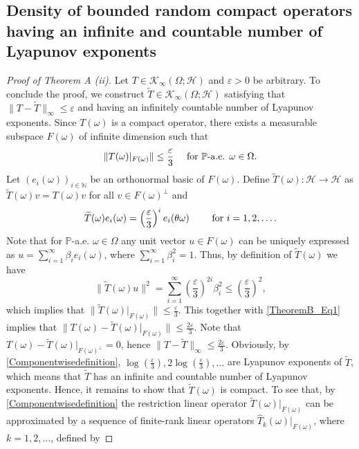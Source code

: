 \documentclass[pdflatex,sn-mathphys-num]{sn-jnl}%
\theoremstyle{thmstyleone}%
\theoremstyle{thmstyletwo}%
\theoremstyle{thmstylethree}%
\newcommand{\N}{\mathbb{N}}
\newcommand{\mP}{\mathbb{P}}
\newcommand{\cH}{\mathcal{H}}
\newcommand{\eps}{\varepsilon}
\numberwithin{equation}{section}
\begin{document}
\subsection{Density of bounded random compact operators having an infinite and countable number of Lyapunov exponents
}
%
%
%
%
\begin{proof}[Proof of Theorem A (ii)]
Let $T\in \mathcal K_{\infty}(\Omega;\mathcal H)$ and $\eps>0$ be arbitrary. To conclude the proof, we construct $\widetilde T\in  \mathcal K_{\infty}(\Omega;\mathcal H)$ satisfying that $\|T-\widetilde T\|_{\infty}\leq \eps$ and having an infinitely countable number of Lyapunov exponents. Since $T(\omega)$ is a compact operator, there exists a measurable subspace $F(\omega)$ of infinite dimension such that \begin{equation}\label{TheoremB_Eq1}
\|T(\omega)|_{F(\omega)}\|\leq \frac{\eps}{3}\quad \hbox{ for } \mP\hbox{-a.e. } \omega\in\Omega.
\end{equation}
Let $(e_i(\omega))_{i\in\N}$ be an orthonormal basic of $F(\omega)$. Define $\widetilde T(\omega):\cH\rightarrow \cH$ as $\widetilde T(\omega)v=T(\omega)v$ for all $v\in F(\omega)^{\perp}$ and 
\begin{equation}\label{Componentwisedefinition}
\widetilde T(\omega)e_i(\omega)=\left(\frac{\eps}{3}\right)^i e_i(\theta\omega)\qquad\hbox{ for } i=1,2,\dots.
\end{equation}
Note that for $\mP$-a.e. $\omega\in\Omega$ any unit vector $u\in F(\omega)$  can be uniquely expressed as $u=\sum_{i=1}^{\infty}\beta_i e_i(\omega)$, where $\sum_{i=1}^{\infty}\beta_i^2=1$. Thus, by definition of $\widetilde T(\omega)$ we have 
\[
\|\widetilde T(\omega)u\|^2
=
\sum_{i=1}^{\infty}\left(\frac{\eps}{3}\right)^{2i}\beta_i^2\leq \left(\frac{\eps}{3}\right)^2,
\]
which implies that $\|\widetilde T(\omega)|_{F(\omega)}\|\leq \frac{\eps}{3}$. This together with \eqref{TheoremB_Eq1} implies that $\|T(\omega)-\widetilde T(\omega)|_{F(\omega)}\|\leq \frac{2\eps}{3}$. Note that $T(\omega)-\widetilde T(\omega)|_{F(\omega)^{\perp}}=0$, hence $\|T-\widetilde T\|_{\infty}\leq \frac{2\eps}{3}$. Obviously, by \eqref{Componentwisedefinition}, $\log\left(\frac{\eps}{3}\right), 2\log\left(\frac{\eps}{3}\right),\dots$ are Lyapunov exponents of $\widetilde T$, which means that $\widetilde T$ has an infinite and countable number of  Lyapunov exponents. Hence, it remains to show that $\widetilde T(\omega)$ is compact. To see that, by \eqref{Componentwisedefinition} the restriction linear operator $\widetilde T(\omega)|_{F(\omega)}$ can be approximated by a sequence of finite-rank linear operators $\widehat T_k(\omega)|_{F(\omega)}$, where $k=1,2,\dots$, defined by 

\end{proof}
\end{document}
